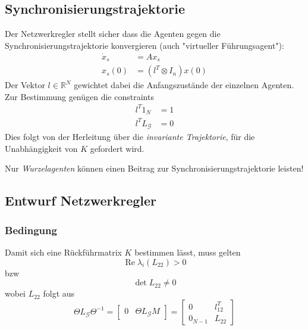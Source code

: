 
\subsection{Synchronisierungstrajektorie}
Der Netzwerkregler stellt sicher dass die Agenten gegen die Synchronisierungstrajektorie
konvergieren (auch "virtueller Führungsagent"):
\begin{align}
    \dot{x}_s &= Ax_s \\
    x_s(0) &= (l^T \otimes I_n) x(0)
\end{align}
Der Vektor $l \in \mathbb{R}^N$ gewichtet dabei die Anfangszustände der einzelnen
Agenten.
Zur Bestimmung genügen die constraints 
\begin{align}
    l^T 1_N &= 1 \\
    l^T L_\mathcal{G} &= 0
\end{align}
Dies folgt von der Herleitung über die \emph{invariante Trajektorie}, für die
Unabhängigkeit von $K$ gefordert wird.

Nur \emph{Wurzelagenten} können einen Beitrag zur 
Synchronisierungstrajektorie leisten!

\subsection{Entwurf Netzwerkregler}

\subsubsection{Bedingung}
Damit sich eine Rückführmatrix $K$ bestimmen lässt, muss gelten
\begin{equation}
    \operatorname{Re} \lambda_i(L_{22}) > 0
\end{equation}
bzw
\begin{equation}
    \det L_{22} \neq 0
\end{equation}
wobei $L_{22}$ folgt aus
\begin{equation}
    \Theta L_\mathcal{G} \Theta^{-1} = \begin{bmatrix}
        0 & \Theta L_\mathcal{G}M
    \end{bmatrix}
    = \begin{bmatrix}
        0 & l_{12}^T \\
        0_{N-1} & L_{22}
    \end{bmatrix}
\end{equation}


